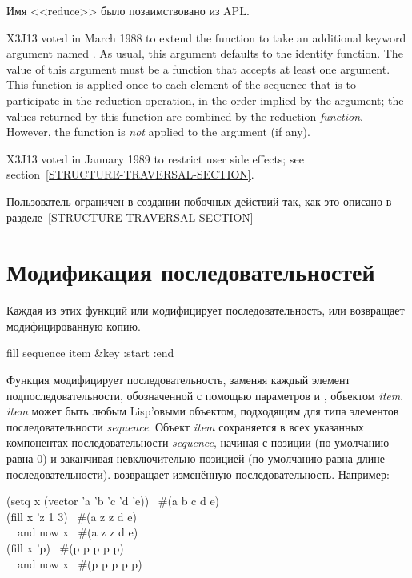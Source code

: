 \begin{defun}[Функция]
Имя <<reduce>> было позаимствовано из {APL}.

\begin{new}
X3J13 voted in March 1988 
to extend the  function to take
an additional keyword argument named .  As usual, this argument
defaults to the identity function.  The value of this argument must be
a function that accepts at least one argument.  This function is applied once
to each element of the
sequence that is to participate in the reduction operation, in the order
implied by the  argument; the values returned by this
function are combined by the reduction \emph{function}.
However, the  function is \emph{not} applied
to the  argument (if any).
\end{new}

\begin{new}
X3J13 voted in January 1989
to restrict user side effects; see section~\ref{STRUCTURE-TRAVERSAL-SECTION}.
\end{new}

Пользователь ограничен в создании побочных действий так, как это описано в
разделе~\ref{STRUCTURE-TRAVERSAL-SECTION}
\end{defun}

\section{Модификация последовательностей}

Каждая из этих функций или модифицирует последовательность, или возвращает
модифицированную копию.

\begin{defun}[Функция]
fill sequence item &key :start :end

Функция модифицирует последовательность, заменяя каждый элемент
подпоследовательности, обозначенной с помощью параметров  и
, объектом \emph{item}. \emph{item} может быть любым Lisp'овыми 
объектом, подходящим для типа элементов последовательности \emph{sequence}. 
Объект \emph{item} сохраняется в всех указанных компонентах
последовательности \emph{sequence}, начиная с позиции  (по-умолчанию
равна 0) и заканчивая невключительно позицией  (по-умолчанию равна
длине последовательности).  возвращает изменённую последовательность.
Например:
\begin{lisp}
(setq x (vector 'a 'b 'c 'd 'e)) \EV\ \#(a b c d e) \\
(fill x 'z  1  3) \EV\ \#(a z z d e) \\
~~\textrm{and now} x \EV\ \#(a z z d e) \\
(fill x 'p) \EV\ \#(p p p p p) \\
~~\textrm{and now} x \EV\ \#(p p p p p)
\end{lisp}
\end{defun}

